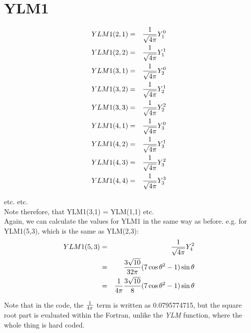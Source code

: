 \section{YLM1}

\begin{eqnarray}
YLM1(2,1)&=&{1 \over \sqrt{4 \pi}} Y_1^0\nonumber\\
YLM1(2,2)&=&{1 \over \sqrt{4 \pi}} Y_1^1\nonumber\\
YLM1(3,1)&=&{1 \over \sqrt{4 \pi}} Y_2^0\nonumber\\
YLM1(3,2)&=&{1 \over \sqrt{4 \pi}} Y_2^1\nonumber\\
YLM1(3,3)&=&{1 \over \sqrt{4 \pi}} Y_2^2\nonumber\\
YLM1(4,1)&=&{1 \over \sqrt{4 \pi}} Y_3^0\nonumber\\
YLM1(4,2)&=&{1 \over \sqrt{4 \pi}} Y_3^1\nonumber\\
YLM1(4,3)&=&{1 \over \sqrt{4 \pi}} Y_3^2\nonumber\\
YLM1(4,4)&=&{1 \over \sqrt{4 \pi}} Y_3^3\nonumber\\
\end{eqnarray}

etc. etc.\\

Note therefore, that YLM1(3,1) = YLM(1,1) etc.\\

Again, we can calculate the values for YLM1 in the same way as before. e.g.
for YLM1(5,3), which is the same as YLM(2,3):\\

\begin{eqnarray}
YLM1(5,3)&=&{1 \over \sqrt{4 \pi}} Y_4^2\nonumber\\
 	 &=&{3 \sqrt{10} \over 32 \pi} (7 \cos\theta^2 - 1) \sin\theta\nonumber\\
         &=&{1 \over 4 \pi} {3 \sqrt{10} \over 8} (7 \cos\theta^2 - 1) \sin\theta\nonumber\\
\end{eqnarray}

Note that in the code, the ${1 \over 4 \pi}$ term is written as
0.0795774715, but the square root part is evaluated within the Fortran,
unlike the \emph{YLM} function, where the whole thing is hard coded.\\

